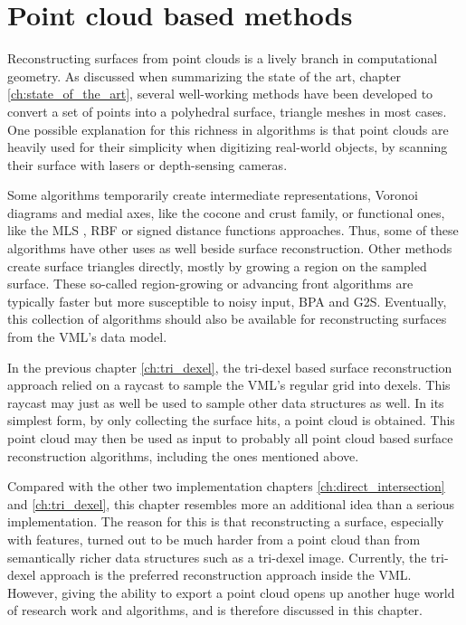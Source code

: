 
\chapter{Point cloud based methods}
\label{ch:point_cloud_based}

Reconstructing surfaces from point clouds is a lively branch in computational geometry.
As discussed when summarizing the state of the art, \cf chapter \ref{ch:state_of_the_art}, several well-working methods have been developed to convert a set of points into a polyhedral surface, \ie triangle meshes in most cases.
One possible explanation for this richness in algorithms is that point clouds are heavily used for their simplicity when digitizing real-world objects, \eg by scanning their surface with lasers or depth-sensing cameras.

Some algorithms temporarily create intermediate representations, \eg Voronoi diagrams and medial axes, like the cocone \cite{cocone, tight_cocone, robust_cocone} and crust \cite{crust, power_crust} family, or functional ones, like the MLS \cite{mls}, RBF \cite{rbf} or signed distance functions \cite{sdf_surface_reconstruction} approaches.
Thus, some of these algorithms have other uses as well beside surface reconstruction.
Other methods create surface triangles directly, mostly by growing a region on the sampled surface.
These so-called region-growing or advancing front algorithms are typically faster but more susceptible to noisy input, \eg BPA and G2S.
Eventually, this collection of algorithms should also be available for reconstructing surfaces from the VML's data model.

In the previous chapter \ref{ch:tri_dexel}, the tri-dexel based surface reconstruction approach relied on a raycast to sample the VML's regular grid into dexels.
This raycast may just as well be used to sample other data structures as well.
In its simplest form, by only collecting the surface hits, a point cloud is obtained.
This point cloud may then be used as input to probably all point cloud based surface reconstruction algorithms, including the ones mentioned above.

Compared with the other two implementation chapters \ref{ch:direct_intersection} and \ref{ch:tri_dexel}, this chapter resembles more an additional idea than a serious implementation.
The reason for this is that reconstructing a surface, especially with features, turned out to be much harder from a point cloud than from semantically richer data structures such as a tri-dexel image.
Currently, the tri-dexel approach is the preferred reconstruction approach inside the VML.
However, giving the ability to export a point cloud opens up another huge world of research work and algorithms, and is therefore discussed in this chapter.


